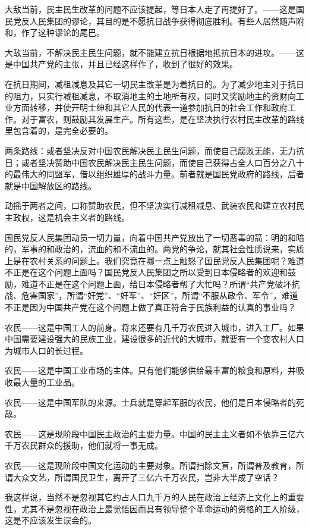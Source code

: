 大敌当前，民主民生改革的问题不应该提起，等日本人走了再提好了。——这是国民党反人民集团的谬论，其目的是不愿抗日战争获得彻底胜利。有些人居然随声附和，作了这种谬论的尾巴。

大敌当前，不解决民主民生问题，就不能建立抗日根据地抵抗日本的进攻。——这是中国共产党的主张，并且已经这样作了，收到了很好的效果。

在抗日期间，减租减息及其它一切民主改革是为着抗日的。为了减少地主对于抗日的阻力，只实行减租减息，不取消地主的土地所有权，同时又奖励地主的资财向工业方面转移，并使开明士绅和其它人民的代表一道参加抗日的社会工作和政府工作。对于富农，则鼓励其发展生产。所有这些，是在坚决执行农村民主改革的路线里包含着的，是完全必要的。

两条路线：或者坚决反对中国农民解决民主民生问题，而使自己腐败无能，无力抗日；或者坚决赞助中国农民解决民主民生问题，而使自己获得占全人口百分之八十的最伟大的同盟军，借以组织雄厚的战斗力量。前者就是国民党政府的路线，后者就是中国解放区的路线。

动摇于两者之间，口称赞助农民，但不坚决实行减租减息、武装农民和建立农村民主政权，这是机会主义者的路线。

国民党反人民集团动员一切力量，向着中国共产党放出了一切恶毒的箭：明的和暗的，军事的和政治的，流血的和不流血的。两党的争论，就其社会性质说来，实质上是在农村关系的问题上。我们究竟在哪一点上触怒了国民党反人民集团呢？难道不正是在这个问题上面吗？国民党反人民集团之所以受到日本侵略者的欢迎和鼓励，难道不正是在这个问题上面，给日本侵略者帮了大忙吗？所谓“共产党破坏抗战、危害国家”，所谓“奸党”、“奸军”、“奸区”，所谓“不服从政令、军令”，难道不正是因为中国共产党在这个问题上做了真正符合于民族利益的认真的事业吗？

农民——这是中国工人的前身。将来还要有几千万农民进入城市，进入工厂。如果中国需要建设强大的民族工业，建设很多的近代的大城市，就要有一个变农村人口为城市人口的长过程。

农民——这是中国工业市场的主体。只有他们能够供给最丰富的粮食和原料，并吸收最大量的工业品。

农民——这是中国军队的来源。士兵就是穿起军服的农民，他们是日本侵略者的死敌。

农民——这是现阶段中国民主政治的主要力量。中国的民主主义者如不依靠三亿六千万农民群众的援助，他们就将一事无成。

农民——这是现阶段中国文化运动的主要对象。所谓扫除文盲，所谓普及教育，所谓大众文艺，所谓国民卫生，离开了三亿六千万农民，岂非大半成了空话？

我这样说，当然不是忽视其它约占人口九千万的人民在政治上经济上文化上的重要性，尤其不是忽视在政治上最觉悟因而具有领导整个革命运动的资格的工人阶级，这是不应该发生误会的。

